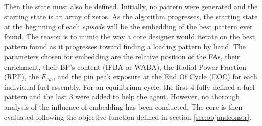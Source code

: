 \documentclass[a4paper]{article}
\begin{document}
Then the state must also be defined. Initially, no pattern were generated and the starting state is an array of zeros. As the algorithm progresses, the starting state at the beginning of each \textit{episode} will be the embedding of the best pattern ever found. The reason is to mimic the way a core designer would iterate on the best pattern found as it progresses toward finding a loading pattern by hand. The parameters chosen for embedding are the relative position of the FAs, their enrichment, their BP's content (IFBA or WABA), the Radial Power Fraction (RPF), the $F_{\Delta h}$, and the pin peak exposure at the End Of Cycle (EOC) for each individual fuel assembly. For an equilibrium cycle, the first 4 fully defined a fuel pattern and the last 3 were added to help the agent. However, no thorough analysis of the influence of embedding has been conducted. The core is then evaluated following the objective function defined in section \ref{sec:objandconstr}.
\end{document}
